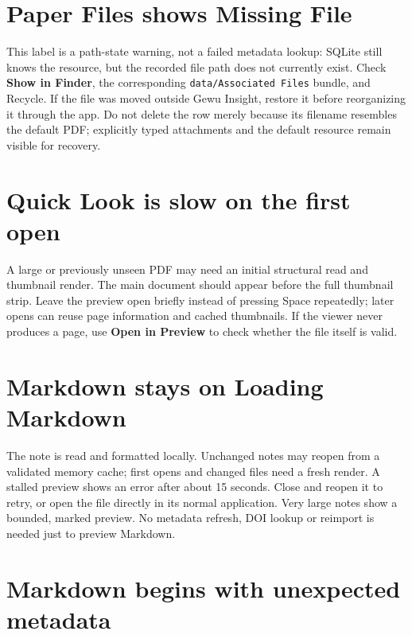 \documentclass[10pt,letterpaper,oneside]{scrreprt}
\begin{document}
\section{Paper Files shows Missing File}\label{paper-files-shows-missing-file}

This label is a path-state warning, not a failed metadata lookup: SQLite still knows the resource, but the recorded file path does not currently exist. Check \textbf{Show in Finder}, the corresponding \nolinkurl{data/Associated Files} bundle, and Recycle. If the file was moved outside Gewu Insight, restore it before reorganizing it through the app. Do not delete the row merely because its filename resembles the default PDF; explicitly typed attachments and the default resource remain visible for recovery.

\section{Quick Look is slow on the first open}\label{quick-look-is-slow-on-the-first-open}

A large or previously unseen PDF may need an initial structural read and thumbnail render. The main document should appear before the full thumbnail strip. Leave the preview open briefly instead of pressing Space repeatedly; later opens can reuse page information and cached thumbnails. If the viewer never produces a page, use \textbf{Open in Preview} to check whether the file itself is valid.

\section{Markdown stays on Loading Markdown}\label{markdown-stays-on-loading-markdown}

The note is read and formatted locally. Unchanged notes may reopen from a validated memory cache; first opens and changed files need a fresh render. A stalled preview shows an error after about 15 seconds. Close and reopen it to retry, or open the file directly in its normal application. Very large notes show a bounded, marked preview. No metadata refresh, DOI lookup or reimport is needed just to preview Markdown.

\section{Markdown begins with unexpected metadata}\label{markdown-begins-with-unexpected-metadata}
\end{document}
